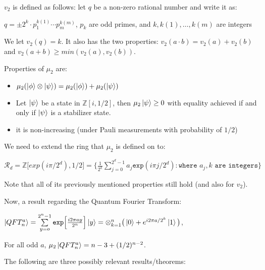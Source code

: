 \documentclass[12pt]{dalthesis}
\begin{document}
$v_2$ is defined as follows: let $q$ be a non-zero rational number and write it as:
\begin{center}
$q = \pm 2^k \cdot p_1^{k(1)} \cdots p_m^{k(m)}$, $p_k$ are odd primes, and $k, k(1), \dots , k(m)$ are integers
\end{center}
We let $v_2 (q) = k$. It also has the two properties: $v_2(a \cdot b) = v_2(a) + v_2(b)$ and $v_2(a + b) \geq min(v_2(a), v_2(b))$.


\vspace{5mm}

Properties of $\mu_2$ are:
\begin{itemize}
\item $\mu_2 (\ket{\phi} \otimes \ket{\psi}) = \mu_2 (\ket{\phi}) + \mu_2 (\ket{\psi})$
\item Let $\ket{\psi}$ be a state in $\mathbb{Z}[i, 1/2]$, then $\mu_2 \ket{\psi} \geq 0$ with equality achieved if and only if $\ket{\psi}$ is a stabilizer state.
\item it is non-increasing (under Pauli measurements with probability of $1/2$)
\end{itemize}

\vspace{5mm}

We need to extend the ring that $\mu_2$ is defined on to:
\begin{center}
$\mathcal{R}_d = \mathbb{Z} \big[ exp(i\pi /2^d), 1/2 \big] = \Big\{ \frac{1}{2^k} \sum\limits_{j=0}^{2^d - 1} a_j \texttt{exp}(i\pi j/2^d): \texttt{where } a_j, k \texttt{ are integers} \Big\}$
\end{center}
Note that all of its previously mentioned properties still hold (and also for $v_2$).

\vspace{5mm}

Now, a result regarding the Quantum Fourier Transform:
\begin{center}
$\ket{QFT_n^a} = \sum\limits_{y=o}^{2^n-1} \texttt{exp}\Big[ \frac{i2\pi ay}{2^n} \Big] \ket{y} = \otimes_{k=1}^n \big( \ket{0} + e^{i2\pi a/2^k}\ket{1}\big)$,
\end{center}
For all odd $a$, $\mu_2\ket{QFT_n^a} = n-3 +(1/2)^{n-2}$.

\vspace{5mm}

The following are three possibly relevant results/theorems:
\end{document}

